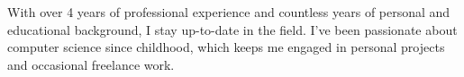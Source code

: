 

\begin{cvparagraph}

With over 4 years of professional experience and countless years of personal and educational background, I stay up-to-date in the field. I've been passionate about computer science since childhood, which keeps me engaged in personal projects and occasional freelance work.
\end{cvparagraph}
